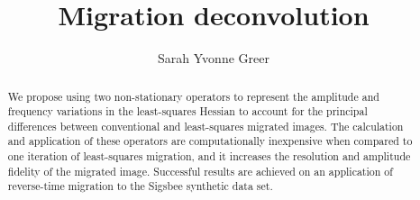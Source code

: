 \title{Migration deconvolution}
\author{Sarah Yvonne Greer}
\maketitle

\newcommand*{\tran}{^{\mkern-1.5mu\mathsf{T}}}
\maketitle
\begin{abstract}
    We propose using two non-stationary operators to represent the amplitude and frequency variations in the least-squares Hessian to account for the principal differences between conventional and least-squares migrated images.
    The calculation and application of these operators are computationally inexpensive when compared to one iteration of least-squares migration,
    and it increases the resolution and amplitude fidelity of the migrated image.
    Successful results are achieved on an application of reverse-time migration to the Sigsbee synthetic data set.
\end{abstract}

